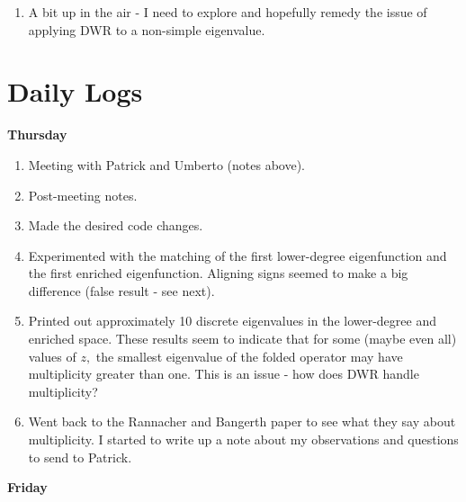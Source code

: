 \documentclass[12pt,a4paper]{article}
\begin{document}
\begin{enumerate}
    \item A bit up in the air - I need to explore and hopefully remedy the issue of applying DWR to a non-simple eigenvalue.
\end{enumerate}


\section{Daily Logs}

\textbf{Thursday}

\begin{enumerate}
    \item Meeting with Patrick and Umberto (notes above).
    \item Post-meeting notes.
    \item Made the desired code changes. 
    \item Experimented with the matching of the first lower-degree eigenfunction and the first enriched eigenfunction. Aligning signs seemed to make a big difference (false result - see next).
    \item Printed out approximately 10 discrete eigenvalues in the lower-degree and enriched space. These results seem to indicate that for some (maybe even all) values of $z,$ the smallest eigenvalue of the folded operator may have multiplicity greater than one. This is an issue - how does DWR handle multiplicity?
    \item Went back to the Rannacher and Bangerth paper to see what they say about multiplicity. I started to write up a note about my observations and questions to send to Patrick.
\end{enumerate}

\textbf{Friday}
\end{document}
